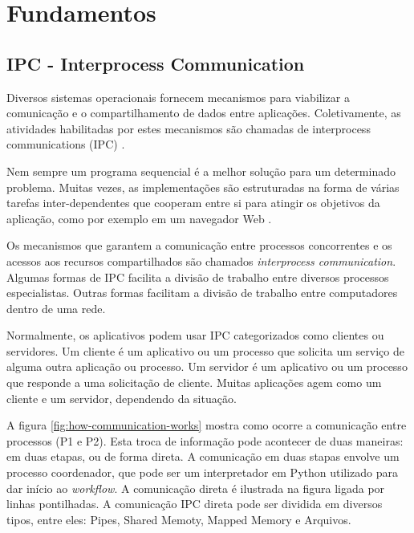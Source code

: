 \chapter[Fundamentos]{Fundamentos}

\section{IPC - Interprocess Communication}\label{sec:ipc}


Diversos sistemas operacionais fornecem mecanismos para viabilizar a comunicação e o compartilhamento de dados entre aplicações. Coletivamente, as atividades habilitadas por estes mecanismos são chamadas de interprocess communications (IPC) \cite{microsoft-ipc}.

Nem sempre um programa sequencial é a melhor solução para um determinado problema. Muitas vezes, as implementações são estruturadas na forma de várias tarefas inter-dependentes que cooperam entre si para atingir os objetivos da aplicação, como por exemplo em um navegador Web \cite{sistemas-op-mazierro}.

Os mecanismos que garantem a comunicação entre processos concorrentes e os acessos aos recursos compartilhados são chamados \textit{interprocess communication}. Algumas formas de IPC facilita a divisão de trabalho entre diversos processos especialistas. Outras formas facilitam a divisão de trabalho entre computadores dentro de uma rede.

Normalmente, os aplicativos podem usar IPC categorizados como clientes ou servidores. Um cliente é um aplicativo ou um processo que solicita um serviço de alguma outra aplicação ou processo. Um servidor é um aplicativo ou um processo que responde a uma solicitação de cliente. Muitas aplicações agem como um cliente e um servidor, dependendo da situação. \cite{ipc-microsoft}

A figura \ref{fig:how-communication-works} mostra como ocorre a comunicação entre processos (P1 e P2). Esta troca de informação pode acontecer de duas maneiras: em duas etapas, ou de forma direta. A comunicação em duas stapas envolve um processo coordenador, que pode ser um interpretador em Python utilizado para dar início ao \textit{workflow}. A comunicação direta é ilustrada na figura ligada por linhas pontilhadas. A comunicação IPC direta pode ser dividida em diversos tipos, entre eles: Pipes, Shared Memoty, Mapped Memory e Arquivos.

